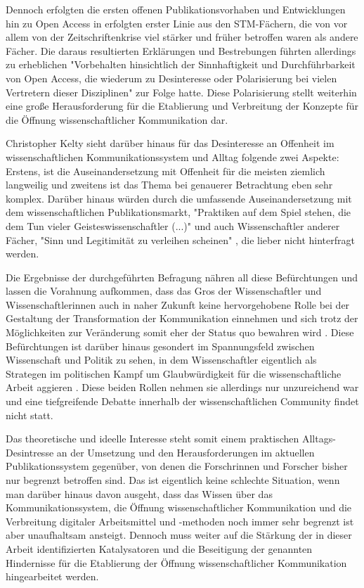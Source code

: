 Dennoch erfolgten die ersten offenen Publikationsvorhaben und Entwicklungen hin zu Open Access in erfolgten erster Linie aus den STM-Fächern, die von vor allem von der Zeitschriftenkrise viel stärker und früher betroffen waren als andere Fächer. Die daraus resultierten Erklärungen und Bestrebungen führten allerdings zu erheblichen "Vorbehalten hinsichtlich der Sinnhaftigkeit und Durchführbarkeit von Open Access, die wiederum zu Desinteresse oder Polarisierung bei vielen Vertretern dieser Disziplinen" \cite{naeder_2010_open} zur Folge hatte. Diese Polarisierung stellt weiterhin eine große Herausforderung für die Etablierung und Verbreitung der Konzepte für die Öffnung wissenschaftlicher Kommunikation dar.

Christopher Kelty sieht darüber hinaus für das Desinteresse an Offenheit im wissenschaftlichen Kommunikationssystem und Alltag folgende zwei Aspekte: Erstens, ist die Auseinandersetzung mit Offenheit für die meisten ziemlich langweilig und zweitens ist das Thema bei genauerer Betrachtung eben sehr komplex. Darüber hinaus würden durch die umfassende Auseinandersetzung mit dem wissenschaftlichen Publikationsmarkt, "Praktiken auf dem Spiel stehen, die dem Tun vieler Geisteswissenschaftler (...)" und auch Wissenschaftler anderer Fächer, "Sinn und Legitimität zu verleihen scheinen" \cite{Hirschi_2015_buch_oa}, die lieber nicht hinterfragt werden.

Die Ergebnisse der durchgeführten Befragung nähren all diese Befürchtungen und lassen die Vorahnung aufkommen, dass das Gros der Wissenschaftler und Wissenschaftlerinnen auch in naher Zukunft keine hervorgehobene Rolle bei der Gestaltung der Transformation der Kommunikation einnehmen und sich trotz der Möglichkeiten zur Veränderung somit eher der Status quo bewahren wird \cite{nosek_2012_scientific}. Diese Befürchtungen ist darüber hinaus gesondert im Spannungsfeld zwischen Wissenschaft und Politik zu sehen, in dem Wissenschaftler eigentlich als Strategen im politischen Kampf um Glaubwürdigkeit für die wissenschaftliche Arbeit aggieren \cite{latour_2013_laboratory}. Diese beiden Rollen nehmen sie allerdings nur unzureichend war und eine tiefgreifende Debatte innerhalb der wissenschaftlichen Community findet nicht statt.

Das theoretische und ideelle Interesse steht somit einem praktischen Alltags-Desintresse an der Umsetzung und den Herausforderungen im aktuellen Publikationssystem gegenüber, von denen die Forschrinnen und Forscher bisher nur begrenzt betroffen sind. Das ist eigentlich keine schlechte Situation, wenn man darüber hinaus davon ausgeht, dass das Wissen über das Kommunikationssystem, die Öffnung wissenschaftlicher Kommunikation und die Verbreitung digitaler Arbeitsmittel und -methoden noch immer sehr begrenzt ist aber unaufhaltsam ansteigt. Dennoch muss weiter auf die Stärkung der in dieser Arbeit identifizierten Katalysatoren und die Beseitigung der genannten Hindernisse für die Etablierung der Öffnung wissenschaftlicher Kommunikation hingearbeitet werden.

